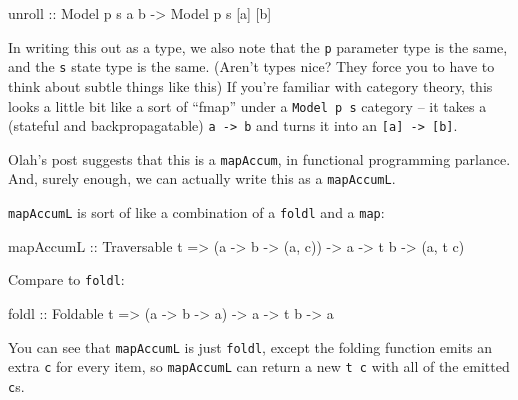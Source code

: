 \documentclass[]{article}
\newenvironment{Shaded}{}{}
\newcommand{\DataTypeTok}[1]{\textcolor[rgb]{0.56,0.13,0.00}{#1}}
\newcommand{\NormalTok}[1]{#1}
\newcommand{\OtherTok}[1]{\textcolor[rgb]{0.00,0.44,0.13}{#1}}
\begin{document}
\begin{Shaded}
\begin{Highlighting}[]
\OtherTok{unroll ::} \DataTypeTok{Model}\NormalTok{ p s a b }\OtherTok{->} \DataTypeTok{Model}\NormalTok{ p s [a] [b]}
\end{Highlighting}
\end{Shaded}

In writing this out as a type, we also note that the \texttt{p} parameter type
is the same, and the \texttt{s} state type is the same. (Aren't types nice? They
force you to have to think about subtle things like this) If you're familiar
with category theory, this looks a little bit like a sort of ``fmap'' under a
\texttt{Model\ p\ s} category -- it takes a (stateful and backpropagatable)
\texttt{a\ -\textgreater{}\ b} and turns it into an
\texttt{{[}a{]}\ -\textgreater{}\ {[}b{]}}.

Olah's post suggests that this is a \texttt{mapAccum}, in functional programming
parlance. And, surely enough, we can actually write this as a
\texttt{mapAccumL}.

\texttt{mapAccumL} is sort of like a combination of a \texttt{foldl} and a
\texttt{map}:

\begin{Shaded}
\begin{Highlighting}[]
\NormalTok{mapAccumL}
\OtherTok{    ::} \DataTypeTok{Traversable}\NormalTok{ t}
    \OtherTok{=>}\NormalTok{ (a }\OtherTok{->}\NormalTok{ b }\OtherTok{->}\NormalTok{ (a, c))}
    \OtherTok{->}\NormalTok{ a}
    \OtherTok{->}\NormalTok{ t b}
    \OtherTok{->}\NormalTok{ (a, t c)}
\end{Highlighting}
\end{Shaded}

Compare to \texttt{foldl}:

\begin{Shaded}
\begin{Highlighting}[]
\NormalTok{foldl}
\OtherTok{    ::} \DataTypeTok{Foldable}\NormalTok{ t}
    \OtherTok{=>}\NormalTok{ (a }\OtherTok{->}\NormalTok{ b }\OtherTok{->}\NormalTok{ a)}
    \OtherTok{->}\NormalTok{ a}
    \OtherTok{->}\NormalTok{ t b}
    \OtherTok{->}\NormalTok{ a}
\end{Highlighting}
\end{Shaded}

You can see that \texttt{mapAccumL} is just \texttt{foldl}, except the folding
function emits an extra \texttt{c} for every item, so \texttt{mapAccumL} can
return a new \texttt{t\ c} with all of the emitted \texttt{c}s.
\end{document}
